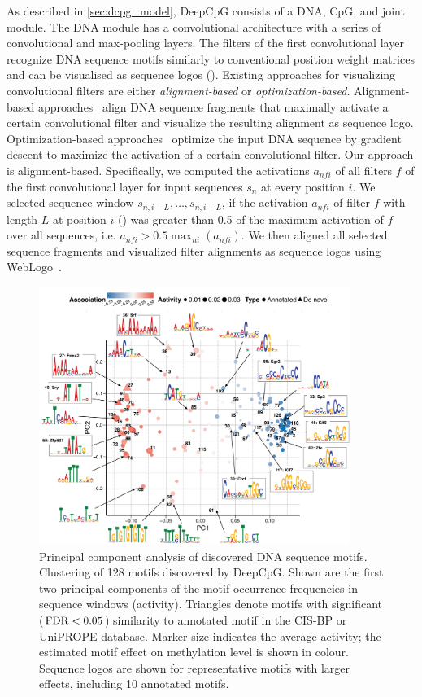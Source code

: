 As described in \cref{sec:dcpg_model}, DeepCpG consists of a DNA, CpG, and joint module. The DNA module has a convolutional architecture with a series of convolutional and max-pooling layers. The filters of the first convolutional layer recognize DNA sequence motifs similarly to conventional position weight matrices and can be visualised as sequence logos (). Existing approaches for visualizing convolutional filters are either \emph{alignment-based} or \emph{optimization-based}. Alignment-based approaches~\citep{alipanahi_predicting_2015,kelley_basset:_2016,quang_danq:_2016} align DNA sequence fragments that maximally activate a certain convolutional filter and visualize the resulting alignment as sequence logo. Optimization-based approaches~\citep{lanchantin_deep_2016,lanchantin_deep_2016-1} optimize the input DNA sequence by gradient descent to maximize the activation of a certain convolutional filter. Our approach is alignment-based. Specifically, we computed the activations $a_{nfi}$ of all filters $f$ of the first convolutional layer for input sequences $s_n$ at every position $i$. We selected sequence window $s_{n,i-L},\ldots,s_{n,i+L}$, if the activation $a_{nfi}$ of filter $f$ with length $L$ at position $i$ () was greater than 0.5 of the maximum activation of $f$ over all sequences, i.e. $a_{nfi}>0.5 \max_{ni}(a_{nfi})$. We then aligned all selected sequence fragments and visualized filter alignments as sequence logos using WebLogo~\citep{crooks_weblogo:_2004}.

\begin{figure}[htbp!]
\centering
\includegraphics[width=0.9\textwidth]{motifs_pca}
\caption[Principal component analysis of discovered DNA sequence motifs.]{Principal component analysis of discovered DNA sequence motifs. Clustering of 128 motifs discovered by DeepCpG. Shown are the first two principal components of the motif occurrence frequencies in sequence windows (activity). Triangles denote motifs with significant ($\operatorname{FDR}<0.05$) similarity to annotated motif in the CIS-BP or UniPROPE database. Marker size indicates the average activity; the estimated motif effect on methylation level is shown in colour. Sequence logos are shown for representative motifs with larger effects, including 10 annotated motifs.}
\label{fig:dcpg_motifs_pca}
\end{figure}

